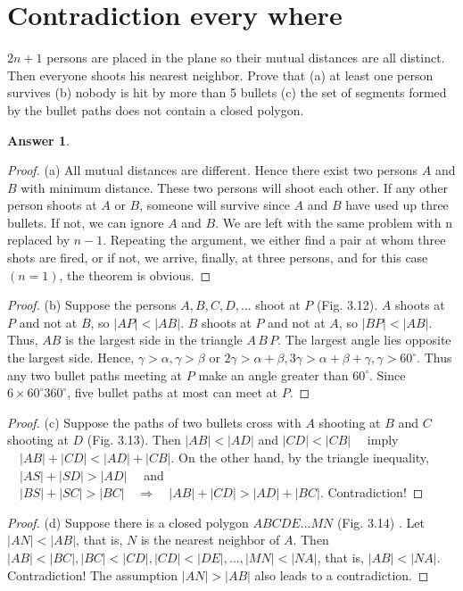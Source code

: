 \documentclass{article}
\renewcommand{\(}{\left(}
\renewcommand{\)}{\right)}
\theoremstyle{plain}
\theoremstyle{plain}
\theoremstyle{definition}
\newtheorem*{answer}{Answer}
\begin{document}
\section{Contradiction every where}
$2n + 1$ persons are placed in the plane so their mutual distances are all distinct. Then everyone
shoots his nearest neighbor. Prove that (a) at least one person survives (b) nobody is hit by more than
5 bullets (c) the set of segments formed by the bullet paths does not contain a closed polygon.
\begin{shaded}
\begin{answer}
$$  $$
\begin{proof}
(a) All mutual distances are different. Hence there exist two persons $A$ and $B$ with
minimum distance. These two persons will shoot each other. If any other person
shoots at $A$ or $B$, someone will survive since $A$ and $B$ have used up three bullets. If
not, we can ignore $A$ and $B$. We are left with the same problem with n replaced by
$n − 1$. Repeating the argument, we either find a pair at whom three shots are fired,
or if not, we arrive, finally, at three persons, and for this case $(n = 1)$, the theorem
is obvious.
\end{proof}
\begin{proof}
(b) Suppose the persons $A,B,C,D, . . . $ shoot at $P$ (Fig. 3.12). $A$ shoots at $P$ and
not at $B$, so $|AP| < |AB|$. $B$ shoots at $P$ and not at $A$, so $|BP| < |AB|$. Thus, $AB$ is
the largest side in the triangle $A\,B\,P$. The largest angle lies opposite the largest side.
Hence, $\gamma > \alpha, \gamma > \beta$ or $2\gamma > \alpha + \beta, 3\gamma > \alpha + \beta + \gamma ,\gamma > 60^{\circ}$. Thus any two
bullet paths meeting at $P$ make an angle greater than $60^{\circ}$. Since $6 × 60^{\circ} 360^{\circ}$,
five bullet paths at most can meet at $P$.

\end{proof}
\begin{proof}
(c) Suppose the paths of two bullets cross with $A$ shooting at $B$ and $C$ shooting
at $D$ (Fig. 3.13). Then $|AB| < |AD|$ and $|CD| < |CB|\quad $ imply $\quad |AB| + |CD| <
|AD| + |CB|$. On the other hand, by the triangle inequality, $ \quad |AS| + |SD| > |AD| \quad $
and $ \quad |BS| + |SC| > |BC| \quad \Rightarrow \quad |AB| + |CD| > |AD| + |BC|$. Contradiction!
\end{proof}
\begin{proof}
  (d) Suppose there is a closed polygon $ABCDE \dots  MN$  (Fig. 3.14) . Let $|AN| <
|AB|$, that is, $N$ is the nearest neighbor of $A$. Then $|AB| < |BC|, |BC| < |CD|,
|CD| < |DE|, . . ., |MN| < |NA|$, that is, $|AB| < |NA|$. Contradiction! The
assumption $|AN| > |AB|$ also leads to a contradiction.
\end{proof}

\end{answer}
\end{shaded}
\end{document}
